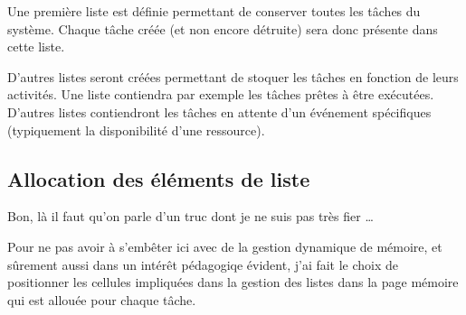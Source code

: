    Une première liste est définie permettant de conserver toutes les
tâches du système. Chaque tâche créée (et non encore détruite) sera
donc présente dans cette liste.

   D'autres listes seront créées permettant de stoquer les tâches en
fonction de leurs activités. Une liste contiendra par exemple les
tâches prêtes à être exécutées. D'autres listes contiendront les
tâches en attente d'un événement spécifiques (typiquement la
disponibilité d'une ressource).
   

\subsection{Allocation des éléments de liste}

   Bon, là il faut qu'on parle d'un truc dont je ne suis pas très fier
\ldots

   Pour ne pas avoir à s'em\lodts bêter ici avec de la gestion
dynamique de mémoire, et sûrement aussi dans un intérêt pédagogiqe
évident, j'ai fait le choix de positionner les cellules impliquées
dans la gestion des listes dans la page mémoire qui est allouée pour
chaque tâche.

        
 
